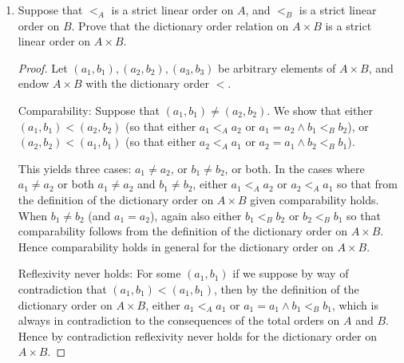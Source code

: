 \documentclass[11pt]{article}
\begin{document}
\begin{enumerate}
\begin{proof}
        Symmetry: Let $x,y\in \mathbb{R}$, and suppose that $(x,y)\in S$; that is, $x-y\in\mathbb{Z}$. Then observe that $y-x = -(x-y)$, and since $x-y\in\mathbb{Z}$, then $-(x-y) = y-x\in\mathbb{Z}$ also since $\mathbb{Z}$ is closed under addition (and subtraction). Hence $(y,x)\in S$, and so $S$ is symmetric.

        Transitivity: Let $x,y,z\in \mathbb{Z}$ with $(x,y), (y,z)\in S$ so that $x-y, y-z\in \mathbb{Z}$. Then observe that $x-z = (x-y)+(y-z)$ and again by closure of addition in $\mathbb{Z}$, $x-z\in \mathbb{Z}$ so that $(x,z)\in \mathbb{Z}$. Hence $S$ is transitive also. 

        It follows that $S$ is an equivalence relation on $\mathbb{R}$.
    \end{proof}
    \item Suppose that $<_A$ is a strict linear order on $A$, and $<_B$ is a strict linear order on $B$. Prove that the dictionary order relation on $A\times B$ is a strict linear order on $A\times B$.
    \begin{proof}
        Let $(a_1,b_1), (a_2, b_2), (a_3, b_3)$ be arbitrary elements of $ A\times B$, and endow $A\times B$ with the dictionary order $<$.

        Comparability: Suppose that $(a_1, b_1)\neq (a_2, b_2)$. We show that either $(a_1, b_1) < (a_2, b_2)$ (so that either $a_1 <_A a_2$ or $a_1 = a_2\land b_1<_B b_2$), or $(a_2, b_2) < (a_1, b_1)$ (so that either $a_2 <_A a_1$ or $a_2 = a_1\land b_2<_B b_1$).
        
        This yields three cases: $a_1\neq a_2$, or $b_1\neq b_2$, or both. In the cases where $a_1\neq a_2$ or both $a_1\neq a_2$ and $b_1\neq b_2$, either $a_1<_A a_2$ or $a_2 <_A a_1$ so that from the definition of the dictionary order on $A\times B$ given comparability holds. When $b_1\neq b_2$ (and $a_1 = a_2$), again also either $b_1 <_B b_2$ or $b_2<_B b_1$ so that comparability follows from the definition of the dictionary order on $A\times B$. Hence comparability holds in general for the dictionary order on $A\times B$.

        Reflexivity never holds: For some $(a_1, b_1)$ if we suppose by way of contradiction that $(a_1, b_1) < (a_1, b_1)$, then by the definition of the dictionary order on $A\times B$, either $a_1<_A a_1$ or $a_1 = a_1\land b_1 <_B b_1$, which is always in contradiction to the consequences of the total orders on $A$ and $B$. Hence by contradiction reflexivity never holds for the dictionary order on $A\times B$.


\end{proof}
\end{enumerate}
\end{document}
